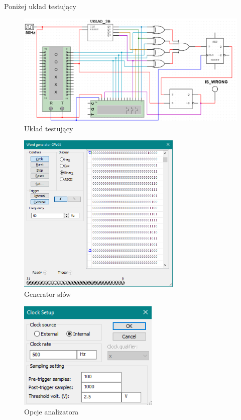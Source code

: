 \documentclass{article}
\begin{document}
Poniżej układ testujący

\begin{figure}[H]
    \centering
    \includegraphics[width=\textwidth]{3b_test.png}
    \caption{Układ testujący}
\end{figure}

\begin{figure}[H]
    \centering
    \includegraphics[width=0.7\textwidth]{3b_test_gen.png}
    \caption{Generator słów}
\end{figure}

\begin{figure}[H]
    \centering
    \includegraphics[width=0.6\textwidth]{3b_impl_ana_opc.png}
    \caption{Opcje analizatora}
\end{figure}
\end{document}
